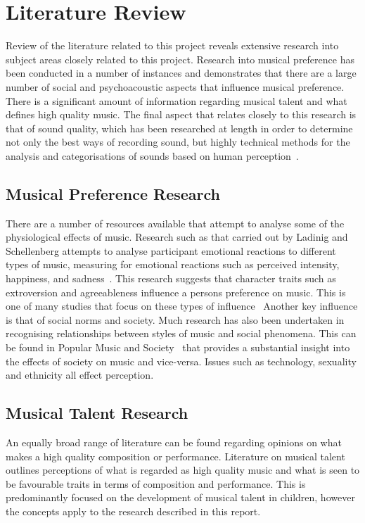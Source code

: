 \documentclass[titlepage]{scrartcl}
\begin{document}
    \section{Literature Review}\label{LR}
    Review of the literature related to this project reveals extensive research
    into subject areas closely related to this project. Research into musical
    preference has been conducted in a number of instances and demonstrates
    that there are a large number of social and psychoacoustic aspects that
    influence musical preference. There is a significant amount of
    information regarding musical talent and what defines high quality music.
    The final aspect that relates closely to this research is that of sound
    quality, which has been researched at length in order to determine not only
    the best ways of recording sound, but highly technical methods for the
    analysis and categorisations of sounds based on human
    perception~\parencite{hal}.

    \subsection{Musical Preference Research}
    There are a number of resources available that attempt to analyse some of
    the physiological effects of music. Research such as that carried out by
    Ladinig and Schellenberg attempts to analyse participant emotional
    reactions to different types of music, measuring for emotional reactions
    such as perceived intensity, happiness, and sadness~\parencite{lum}. This
    research suggests that character traits such as extroversion and
    agreeableness influence a persons preference on music. This is one of many
    studies that focus on these types of
    influence~\parencite{kessler2004semmp,eamim}
    Another key influence is that of social norms and society. Much research
    has also been undertaken in recognising relationships between styles of
    music and social phenomena. This can be found in Popular Music and
    Society~\parencite{longhurst2007pmas} that provides a substantial insight
    into the effects of society on music and vice-versa. Issues such as
    technology, sexuality and ethnicity all effect perception.
    
    \subsection{Musical Talent Research}
    An equally broad range of literature can be found regarding opinions on what
    makes a high quality composition or performance. Literature on musical
    talent outlines perceptions of what is regarded as high quality music and
    what is seen to be favourable traits in terms of composition and
    performance. This is predominantly focused on the development of musical
    talent in children, however the concepts apply to the research described in
    this report.~\parencite{spark, hoffman2015blessed, kingsbury2001mtp}
\end{document}
